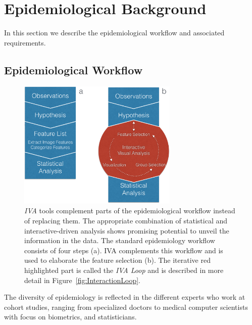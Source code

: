 \documentclass[journal]{style/vgtc} 			          %
\begin{document}
\section{Epidemiological Background} \label{MedicalAndTechnicalBackground}

In this section we describe the epidemiological workflow and associated requirements.

\subsection{Epidemiological Workflow} \label{EpidemiologicalWorkflow}
\begin{figure}[htb]
 \centering
 \includegraphics[width=3.0in]{figures/workflow_comparison}
 \caption{\emph{IVA} tools complement parts of the epidemiological workflow instead of replacing them.
 The appropriate combination of statistical and interactive-driven analysis shows promising potential to unveil the information in the data.
 The standard epidemiology workflow consists of four steps (a).
 IVA complements this workflow and is used to elaborate the feature selection (b).
 The iterative red highlighted part is called the \emph{IVA Loop} and is described in more detail in Figure~\ref{fig:InteractionLoop}.
 }
  \label{fig:WorkflowComparison}
\end{figure}
The diversity of epidemiology is reflected in the different experts who work at cohort studies, ranging from specialized doctors to medical computer scientists with focus on biometrics, and statisticians.
\end{document}
